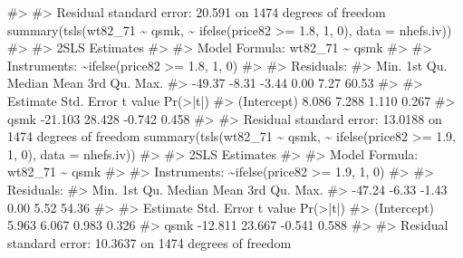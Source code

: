 \documentclass[
  10pt,
  a4paper,
]{book}
\newenvironment{Shaded}{\begin{snugshade}}{\end{snugshade}}
\newcommand{\AttributeTok}[1]{\textcolor[rgb]{0.40,0.45,0.13}{#1}}
\newcommand{\CommentTok}[1]{\textcolor[rgb]{0.37,0.37,0.37}{#1}}
\newcommand{\DecValTok}[1]{\textcolor[rgb]{0.68,0.00,0.00}{#1}}
\newcommand{\FloatTok}[1]{\textcolor[rgb]{0.68,0.00,0.00}{#1}}
\newcommand{\FunctionTok}[1]{\textcolor[rgb]{0.28,0.35,0.67}{#1}}
\newcommand{\NormalTok}[1]{\textcolor[rgb]{0.00,0.46,0.62}{#1}}
\newcommand{\SpecialCharTok}[1]{\textcolor[rgb]{0.37,0.37,0.37}{#1}}
\begin{document}
\begin{Shaded}
\begin{Highlighting}[]
\CommentTok{\#\textgreater{} }
\CommentTok{\#\textgreater{} Residual standard error: 20.591 on 1474 degrees of freedom}
\FunctionTok{summary}\NormalTok{(}\FunctionTok{tsls}\NormalTok{(wt82\_71 }\SpecialCharTok{\textasciitilde{}}\NormalTok{ qsmk, }\SpecialCharTok{\textasciitilde{}} \FunctionTok{ifelse}\NormalTok{(price82 }\SpecialCharTok{\textgreater{}=} \FloatTok{1.8}\NormalTok{, }\DecValTok{1}\NormalTok{, }\DecValTok{0}\NormalTok{), }\AttributeTok{data =}\NormalTok{ nhefs.iv))}
\CommentTok{\#\textgreater{} }
\CommentTok{\#\textgreater{}  2SLS Estimates}
\CommentTok{\#\textgreater{} }
\CommentTok{\#\textgreater{} Model Formula: wt82\_71 \textasciitilde{} qsmk}
\CommentTok{\#\textgreater{} }
\CommentTok{\#\textgreater{} Instruments: \textasciitilde{}ifelse(price82 \textgreater{}= 1.8, 1, 0)}
\CommentTok{\#\textgreater{} }
\CommentTok{\#\textgreater{} Residuals:}
\CommentTok{\#\textgreater{}    Min. 1st Qu.  Median    Mean 3rd Qu.    Max. }
\CommentTok{\#\textgreater{}  {-}49.37   {-}8.31   {-}3.44    0.00    7.27   60.53 }
\CommentTok{\#\textgreater{} }
\CommentTok{\#\textgreater{}             Estimate Std. Error t value Pr(\textgreater{}|t|)}
\CommentTok{\#\textgreater{} (Intercept)    8.086      7.288   1.110    0.267}
\CommentTok{\#\textgreater{} qsmk         {-}21.103     28.428  {-}0.742    0.458}
\CommentTok{\#\textgreater{} }
\CommentTok{\#\textgreater{} Residual standard error: 13.0188 on 1474 degrees of freedom}
\FunctionTok{summary}\NormalTok{(}\FunctionTok{tsls}\NormalTok{(wt82\_71 }\SpecialCharTok{\textasciitilde{}}\NormalTok{ qsmk, }\SpecialCharTok{\textasciitilde{}} \FunctionTok{ifelse}\NormalTok{(price82 }\SpecialCharTok{\textgreater{}=} \FloatTok{1.9}\NormalTok{, }\DecValTok{1}\NormalTok{, }\DecValTok{0}\NormalTok{), }\AttributeTok{data =}\NormalTok{ nhefs.iv))}
\CommentTok{\#\textgreater{} }
\CommentTok{\#\textgreater{}  2SLS Estimates}
\CommentTok{\#\textgreater{} }
\CommentTok{\#\textgreater{} Model Formula: wt82\_71 \textasciitilde{} qsmk}
\CommentTok{\#\textgreater{} }
\CommentTok{\#\textgreater{} Instruments: \textasciitilde{}ifelse(price82 \textgreater{}= 1.9, 1, 0)}
\CommentTok{\#\textgreater{} }
\CommentTok{\#\textgreater{} Residuals:}
\CommentTok{\#\textgreater{}    Min. 1st Qu.  Median    Mean 3rd Qu.    Max. }
\CommentTok{\#\textgreater{}  {-}47.24   {-}6.33   {-}1.43    0.00    5.52   54.36 }
\CommentTok{\#\textgreater{} }
\CommentTok{\#\textgreater{}             Estimate Std. Error t value Pr(\textgreater{}|t|)}
\CommentTok{\#\textgreater{} (Intercept)    5.963      6.067   0.983    0.326}
\CommentTok{\#\textgreater{} qsmk         {-}12.811     23.667  {-}0.541    0.588}
\CommentTok{\#\textgreater{} }
\CommentTok{\#\textgreater{} Residual standard error: 10.3637 on 1474 degrees of freedom}
\end{Highlighting}
\end{Shaded}
\end{document}
